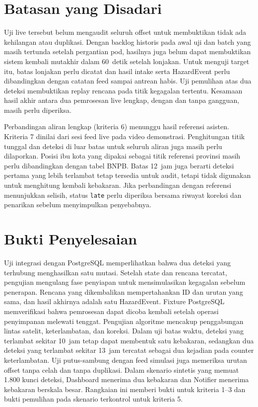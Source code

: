 \section{Batasan yang Disadari}

Uji live tersebut belum mengaudit seluruh offset untuk membuktikan tidak ada kehilangan atau duplikasi. Dengan backlog historis pada awal uji dan batch yang masih tertunda setelah pergantian pod, hasilnya juga belum dapat membuktikan sistem kembali mutakhir dalam 60~detik setelah lonjakan. Untuk menguji target itu, batas lonjakan perlu dicatat dan hasil intake serta HazardEvent perlu dibandingkan dengan catatan feed sampai antrean habis. Uji pemulihan atas dua deteksi membuktikan replay rencana pada titik kegagalan tertentu. Kesamaan hasil akhir antara dua pemrosesan live lengkap, dengan dan tanpa gangguan, masih perlu diperiksa.

Perbandingan aliran lengkap (kriteria 6) menunggu hasil referensi asisten. Kriteria 7 dinilai dari sesi feed live pada video demonstrasi. Penghitungan titik tunggal dan deteksi di luar batas untuk seluruh aliran juga masih perlu dilaporkan. Posisi ibu kota yang dipakai sebagai titik referensi provinsi masih perlu dibandingkan dengan tabel BNPB. Batas 12~jam juga berarti deteksi pertama yang lebih terlambat tetap tersedia untuk audit, tetapi tidak digunakan untuk menghitung kembali kebakaran. Jika perbandingan dengan referensi menunjukkan selisih, status \texttt{late} perlu diperiksa bersama riwayat koreksi dan penarikan sebelum menyimpulkan penyebabnya.

\section{Bukti Penyelesaian}

Uji integrasi dengan PostgreSQL memperlihatkan bahwa dua deteksi yang terhubung menghasilkan satu mutasi. Setelah state dan rencana tercatat, pengujian mengulang fase penyiapan untuk mensimulasikan kegagalan sebelum penerapan. Rencana yang dikembalikan mempertahankan ID dan urutan yang sama, dan hasil akhirnya adalah satu HazardEvent. Fixture PostgreSQL  memverifikasi bahwa pemrosesan dapat dicoba kembali setelah operasi penyimpanan melewati tenggat. Pengujian algoritme mencakup penggabungan lintas satelit, keterlambatan, dan koreksi. Dalam uji batas waktu, deteksi yang terlambat sekitar 10~jam tetap dapat membentuk satu kebakaran, sedangkan dua deteksi yang terlambat sekitar 13~jam tercatat sebagai dua kejadian pada counter keterlambatan. Uji putus-sambung dengan feed simulasi juga memeriksa urutan offset tanpa celah dan tanpa duplikasi. Dalam skenario sintetis yang memuat 1.800 kunci deteksi, Dashboard menerima dua kebakaran dan Notifier menerima kebakaran berskala besar. Rangkaian ini memberi bukti untuk kriteria 1--3 dan bukti pemulihan pada skenario terkontrol untuk kriteria 5.

